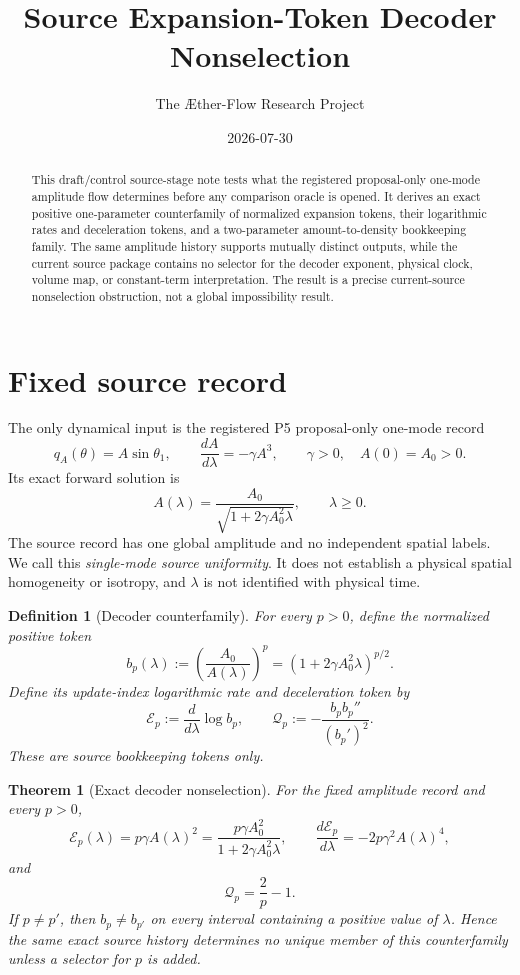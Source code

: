 \documentclass[11pt]{article}
\title{Source Expansion-Token Decoder Nonselection}
\author{The \AE ther-Flow Research Project}
\date{2026-07-30}
\newtheorem{definition}{Definition}
\newtheorem{theorem}{Theorem}
\newcommand{\Ainit}{A_{\!0}}
\newcommand{\Etoken}{\mathcal E}
\newcommand{\Qtoken}{\mathcal Q}
\begin{document}
\maketitle

\begin{abstract}
This draft/control source-stage note tests what the registered proposal-only
one-mode amplitude flow determines before any comparison oracle is opened.
It derives an exact positive one-parameter counterfamily of normalized
expansion tokens, their logarithmic rates and deceleration tokens, and a
two-parameter amount-to-density bookkeeping family.  The same amplitude
history supports mutually distinct outputs, while the current source package
contains no selector for the decoder exponent, physical clock, volume map, or
constant-term interpretation.  The result is a precise current-source
nonselection obstruction, not a global impossibility result.
\end{abstract}

\section{Fixed source record}

The only dynamical input is the registered P5 proposal-only one-mode record
\[
 q_A(\theta)=A\sin\theta_1,\qquad
 \frac{dA}{d\lambda}=-\gamma A^3,\qquad
 \gamma>0,\quad A(0)=\Ainit>0 .
\]
Its exact forward solution is
\[
 A(\lambda)
   =\frac{\Ainit}{\sqrt{1+2\gamma\Ainit^2\lambda}},
 \qquad \lambda\geq0 .
\]
The source record has one global amplitude and no independent spatial labels.
We call this \emph{single-mode source uniformity}.  It does not establish a
physical spatial homogeneity or isotropy, and \(\lambda\) is not identified
with physical time.

\begin{definition}[Decoder counterfamily]
For every \(p>0\), define the normalized positive token
\[
 b_p(\lambda)
   :=\left(\frac{\Ainit}{A(\lambda)}\right)^p
    =\left(1+2\gamma\Ainit^2\lambda\right)^{p/2}.
\]
Define its update-index logarithmic rate and deceleration token by
\[
 \Etoken_p:=\frac{d}{d\lambda}\log b_p,\qquad
 \Qtoken_p:=-\frac{b_p b_p''}{(b_p')^2}.
\]
These are source bookkeeping tokens only.
\end{definition}

\begin{theorem}[Exact decoder nonselection]
\label{thm:decoder}
For the fixed amplitude record and every \(p>0\),
\[
 \Etoken_p(\lambda)
    =p\gamma A(\lambda)^2
    =\frac{p\gamma\Ainit^2}
           {1+2\gamma\Ainit^2\lambda},
 \qquad
 \frac{d\Etoken_p}{d\lambda}
    =-2p\gamma^2 A(\lambda)^4,
\]
and
\[
 \Qtoken_p=\frac{2}{p}-1.
\]
If \(p\neq p'\), then \(b_p\neq b_{p'}\) on every interval containing a
positive value of \(\lambda\).  Hence the same exact source history determines
no unique member of this counterfamily unless a selector for \(p\) is added.
\end{theorem}
\end{document}
